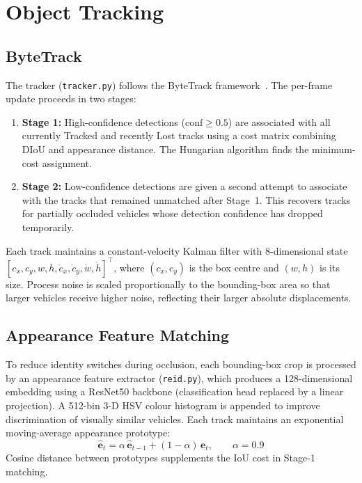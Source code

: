 \documentclass[12pt,a4paper]{report}
\begin{document}
\section{Object Tracking}

\subsection{ByteTrack}

The tracker (\texttt{tracker.py}) follows the ByteTrack framework~\cite{bytetrack}.
The per-frame update proceeds in two stages:

\begin{enumerate}
    \item \textbf{Stage 1:}
          High-confidence detections ($\text{conf} \geq 0.5$) are associated with all
          currently Tracked and recently Lost tracks using a cost matrix combining DIoU
          and appearance distance.  The Hungarian algorithm finds the minimum-cost
          assignment.

    \item \textbf{Stage 2:}
          Low-confidence detections are given a second attempt to associate with the tracks
          that remained unmatched after Stage~1.  This recovers tracks for partially occluded
          vehicles whose detection confidence has dropped temporarily.
\end{enumerate}

Each track maintains a constant-velocity Kalman filter with 8-dimensional state
$[c_x, c_y, w, h, \dot{c}_x, \dot{c}_y, \dot{w}, \dot{h}]^\top$, where $(c_x, c_y)$ is
the box centre and $(w, h)$ is its size.  Process noise is scaled proportionally to the
bounding-box area so that larger vehicles receive higher noise, reflecting their larger
absolute displacements.

\subsection{Appearance Feature Matching}

To reduce identity switches during occlusion, each bounding-box crop is processed by an appearance feature extractor (\texttt{reid.py}), which produces a 128-dimensional embedding using a ResNet50 backbone (classification head replaced by a linear projection).  A 512-bin 3-D HSV colour histogram is appended to improve discrimination of visually similar vehicles. Each track maintains an exponential moving-average appearance prototype:
\begin{equation}
    \hat{\mathbf{e}}_t = \alpha\,\hat{\mathbf{e}}_{t-1} + (1-\alpha)\,\mathbf{e}_t,
    \qquad \alpha = 0.9
    \label{eq:ema}
\end{equation}
Cosine distance between prototypes supplements the IoU cost in Stage-1 matching.
\end{document}
